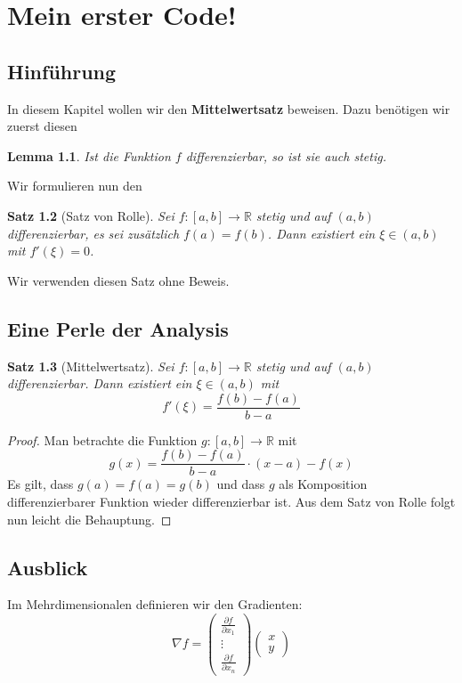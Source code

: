 \documentclass[12pt]{scrreprt}
\newtheorem{satz}{Satz}[section]
\newtheorem{lemma}[satz]{Lemma}
\newcommand{\R}{\mathbb{R}}
\begin{document}
\chapter{Mein erster Code!}

\section{Hinführung}
In diesem Kapitel wollen wir den \textbf{Mittelwertsatz} beweisen.  Dazu benötigen wir zuerst diesen

\begin{lemma}
    Ist die Funktion $f$ differenzierbar, so ist sie auch stetig.
\end{lemma}

Wir formulieren nun den

\begin{satz}[Satz von Rolle]
    Sei $f \colon [a,b] \to \R$ stetig und auf $(a,b)$ differenzierbar, es sei zusätzlich $f(a) =
    f(b)$.  Dann existiert ein $\xi \in (a,b)$ mit $f'(\xi) = 0$.
\end{satz}

Wir verwenden diesen Satz ohne Beweis.

\section{Eine Perle der Analysis}

\begin{satz}[Mittelwertsatz]
    Sei $f \colon [a,b] \to \R$ stetig und auf $(a,b)$ differenzierbar.  Dann existiert ein $\xi \in
    (a,b)$ mit
        \[ f'(\xi) = \frac{f(b)-f(a)}{b-a} \]
\end{satz}
\begin{proof}
    Man betrachte die Funktion $g \colon [a,b] \to \R$ mit
    \[ g(x) = \frac{f(b)-f(a)}{b-a} \cdot (x-a) - f(x) \]
    Es gilt, dass $g(a) = f(a) = g(b)$ und dass $g$ als Komposition differenzierbarer Funktion
    wieder differenzierbar ist.  Aus dem Satz von Rolle folgt nun leicht die Behauptung.
\end{proof}

\section{Ausblick}
Im Mehrdimensionalen definieren wir den Gradienten:
    \[ \nabla f =
        \begin{pmatrix}
            \frac{\partial f}{\partial x_1} \\
            \vdots \\
            \frac{\partial f}{\partial x_n}
        \end{pmatrix}
        \begin{pmatrix}
            x \\
            y
        \end{pmatrix}
    \]
\end{document}
